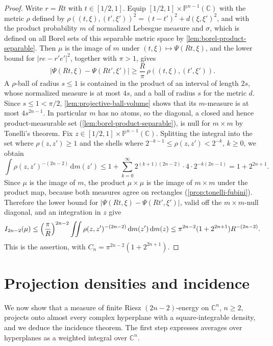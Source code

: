 \begin{proof}
Write $r=Rt$ with $t\in[1/2,1]$. Equip $[1/2,1]\times\mathbb P^{n-1}(\mathbb C)$ with the metric $\rho$ defined by $\rho((t,\xi),(t',\xi'))^2=(t-t')^2+d(\xi,\xi')^2$, and with the product probability $m$ of normalized Lebesgue measure and $\sigma$, which is defined on all Borel sets of this separable metric space by \cref{lem:borel-product-separable}. Then $\mu$ is the image of $m$ under $(t,\xi)\mapsto\Psi(Rt,\xi)$, and the lower bound for $|re-r'e'|^2$, together with $\pi>1$, gives
\[
 |\Psi(Rt,\xi)-\Psi(Rt',\xi')|\geq\frac R\pi\,\rho((t,\xi),(t',\xi')).
\]
A $\rho$-ball of radius $s\leq1$ is contained in the product of an interval of length $2s$, whose normalized measure is at most $4s$, and a ball of radius $s$ for the metric $d$. Since $s\leq1<\pi/2$, \cref{lem:projective-ball-volume} shows that its $m$-measure is at most $4s^{2n-1}$. In particular $m$ has no atoms, so the diagonal, a closed and hence product-measurable set (\cref{lem:borel-product-separable}), is null for $m\times m$ by Tonelli's theorem. Fix $z\in[1/2,1]\times\mathbb P^{n-1}(\mathbb C)$. Splitting the integral into the set where $\rho(z,z')\geq1$ and the shells where $2^{-k-1}\leq\rho(z,z')<2^{-k}$, $k\geq0$, we obtain
\[
 \int\rho(z,z')^{-(2n-2)}\,\mathrm d m(z')
 \leq1+\sum_{k=0}^\infty 2^{(k+1)(2n-2)}\cdot4\cdot2^{-k(2n-1)}=1+2^{2n+1}.
\]
Since $\mu$ is the image of $m$, the product $\mu\times\mu$ is the image of $m\times m$ under the product map, because both measures agree on rectangles (\cref{prop:tonelli-fubini}). Therefore the lower bound for $|\Psi(Rt,\xi)-\Psi(Rt',\xi')|$, valid off the $m\times m$-null diagonal, and an integration in $z$ give
\[
 I_{2n-2}(\mu)\leq\Bigl(\frac\pi R\Bigr)^{2n-2}\iint\rho(z,z')^{-(2n-2)}\,\mathrm d m(z')\,\mathrm d m(z)\leq\pi^{2n-2}(1+2^{2n+1})R^{-(2n-2)}.
\]
This is the assertion, with $C_n=\pi^{2n-2}(1+2^{2n+1})$.
\end{proof}

\section{Projection densities and incidence}
\label{sec:complex-incidence}
We now show that a measure of finite Riesz $(2n-2)$-energy on $\mathbb C^n$, $n\geq2$, projects onto almost every complex hyperplane with a square-integrable density, and we deduce the incidence theorem. The first step expresses averages over hyperplanes as a weighted integral over $\mathbb C^n$.

